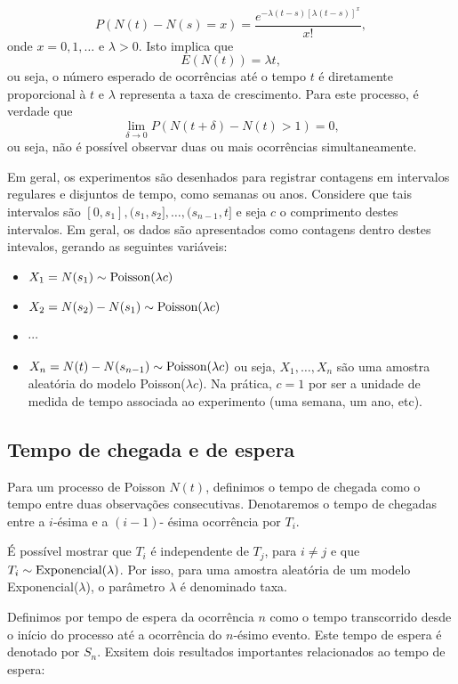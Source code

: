 \documentclass[
  letterpaper,
  DIV=11,
  numbers=noendperiod]{scrreprt}
\providecommand{\tightlist}{%
  \setlength{\itemsep}{0pt}\setlength{\parskip}{0pt}}\usepackage{longtable,booktabs,array}
\theoremstyle{definition}
\theoremstyle{plain}
\theoremstyle{definition}
\theoremstyle{remark}
\begin{document}
\[P(N(t)-N(s)=x)=\frac{e^{-\lambda(t-s)[\lambda(t-s)]^x}}{x!},\] onde
\(x=0,1,\ldots\) e \(\lambda>0\). Isto implica que
\[E(N(t))=\lambda t,\] ou seja, o número esperado de ocorrências até o
tempo \(t\) é diretamente proporcional à \(t\) e \(\lambda\) representa
a taxa de crescimento. Para este processo, é verdade que
\[\lim_{\delta\rightarrow 0}P(N(t+\delta)-N(t)>1)=0,\] ou seja, não é
possível observar duas ou mais ocorrências simultaneamente.

Em geral, os experimentos são desenhados para registrar contagens em
intervalos regulares e disjuntos de tempo, como semanas ou anos.
Considere que tais intervalos são
\([0,s_1],(s_1,s_2],\ldots,(s_{n-1},t]\) e seja \(c\) o comprimento
destes intervalos. Em geral, os dados são apresentados como contagens
dentro destes intevalos, gerando as seguintes variáveis:

\begin{itemize}
\tightlist
\item
  \(X_1=N(s_1)\sim\hbox{Poisson}(\lambda c)\)
\item
  \(X_2=N(s_2)-N(s_1)\sim\hbox{Poisson}(\lambda c)\)
\item
  \(\cdots\)
\item
  \(X_n=N(t)-N(s_{n-1})\sim\hbox{Poisson}(\lambda c)\) ou seja,
  \(X_1,\ldots,X_n\) são uma amostra aleatória do modelo
  Poisson(\(\lambda c\)). Na prática, \(c=1\) por ser a unidade de
  medida de tempo associada ao experimento (uma semana, um ano, etc).
\end{itemize}

\subsection{Tempo de chegada e de
espera}\label{tempo-de-chegada-e-de-espera}

Para um processo de Poisson \(N(t)\), definimos o tempo de chegada como
o tempo entre duas observações consecutivas. Denotaremos o tempo de
chegadas entre a \(i\)-ésima e a \((i-1)\)- ésima ocorrência por
\(T_i\).

É possível mostrar que \(T_i\) é independente de \(T_j\), para
\(i\neq j\) e que \(T_i\sim\hbox{Exponencial}(\lambda)\). Por isso, para
uma amostra aleatória de um modelo Exponencial(\(\lambda\)), o parâmetro
\(\lambda\) é denominado taxa.

Definimos por tempo de espera da ocorrência \(n\) como o tempo
transcorrido desde o início do processo até a ocorrência do \(n\)-ésimo
evento. Este tempo de espera é denotado por \(S_n\). Exsitem dois
resultados importantes relacionados ao tempo de espera:
\end{document}
